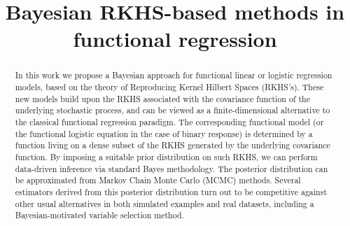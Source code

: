 \documentclass[ba]{imsart}
\numberwithin{equation}{section}
\theoremstyle{plain}
\begin{document}
\begin{frontmatter}
\title{Bayesian RKHS-based methods in functional regression}


\begin{abstract}
In this work we propose a Bayesian approach for functional linear or logistic  regression models, based on the theory of Reproducing Kernel Hilbert Spaces (RKHS's). These new models build upon the RKHS associated with the covariance function of the underlying stochastic process, and can be viewed as a finite-dimensional alternative to the classical functional regression paradigm. The corresponding functional model (or the functional logistic equation in the case of binary response) is determined by a function living on a dense subset of the RKHS generated by the underlying covariance function. By imposing a suitable prior distribution on such RKHS, we can perform data-driven inference via standard Bayes methodology. The posterior distribution can be approximated from Markov Chain Monte Carlo (MCMC) methods. Several estimators derived from this posterior distribution turn out to be competitive against other usual  alternatives in both simulated examples and real datasets, including a Bayesian-motivated variable selection method.
\end{abstract}

\begin{keyword}[class=MSC]
\end{keyword}

\begin{keyword}
\end{keyword}

\end{frontmatter}
\end{document}
